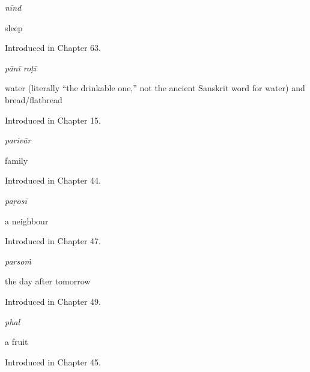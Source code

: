 \noindent\begin{minipage}[t]{\linewidth}
\raggedright
\textbf{}\enspace\emph{nīnd}\par
\small sleep\par
\footnotesize Introduced in Chapter 63.
\end{minipage}\par\medskip

\noindent\begin{minipage}[t]{\linewidth}
\raggedright
\textbf{ }\enspace\emph{pānī roṭī}\par
\small water (literally \textquotedblleft{}the drinkable one,\textquotedblright{} not the ancient Sanskrit word for water) and bread/flatbread\par
\footnotesize Introduced in Chapter 15.
\end{minipage}\par\medskip

\noindent\begin{minipage}[t]{\linewidth}
\raggedright
\textbf{}\enspace\emph{parivār}\par
\small family\par
\footnotesize Introduced in Chapter 44.
\end{minipage}\par\medskip

\noindent\begin{minipage}[t]{\linewidth}
\raggedright
\textbf{}\enspace\emph{paṛosī}\par
\small a neighbour\par
\footnotesize Introduced in Chapter 47.
\end{minipage}\par\medskip

\noindent\begin{minipage}[t]{\linewidth}
\raggedright
\textbf{}\enspace\emph{parsoṁ}\par
\small the day after tomorrow\par
\footnotesize Introduced in Chapter 49.
\end{minipage}\par\medskip

\noindent\begin{minipage}[t]{\linewidth}
\raggedright
\textbf{}\enspace\emph{phal}\par
\small a fruit\par
\footnotesize Introduced in Chapter 45.
\end{minipage}\par\medskip

